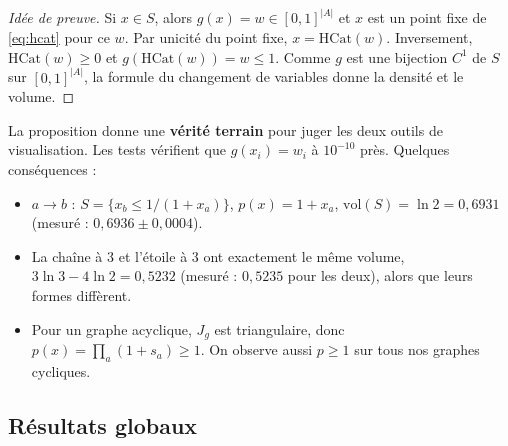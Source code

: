 \documentclass[10pt,a4paper]{article}
\theoremstyle{remark}
\newcommand{\HCat}{\mathrm{HCat}}
\begin{document}
\begin{proof}[Idée de preuve]
Si $x\in S$, alors $g(x)=w\in[0,1]^{|A|}$ et $x$ est un point fixe de \eqref{eq:hcat} pour
ce $w$. Par unicité du point fixe, $x=\HCat(w)$. Inversement, $\HCat(w)\ge0$ et
$g(\HCat(w))=w\le 1$. Comme $g$ est une bijection $C^1$ de $S$ sur $[0,1]^{|A|}$, la formule
du changement de variables donne la densité et le volume.
\end{proof}

La proposition donne une \textbf{vérité terrain} pour juger les deux outils de visualisation.
Les tests vérifient que $g(x_i)=w_i$ à $10^{-10}$ près. Quelques conséquences :
\begin{itemize}
\item $a\to b$ : $S=\{x_b\le 1/(1+x_a)\}$, $p(x)=1+x_a$, $\mathrm{vol}(S)=\ln2=0{,}6931$
(mesuré : $0{,}6936\pm0{,}0004$).
\item La chaîne à 3 et l'étoile à 3 ont exactement le même volume,
$3\ln3-4\ln2=0{,}5232$ (mesuré : $0{,}5235$ pour les deux), alors que leurs formes diffèrent.
\item Pour un graphe acyclique, $J_g$ est triangulaire, donc $p(x)=\prod_a(1+s_a)\ge1$.
On observe aussi $p\ge1$ sur tous nos graphes cycliques.
\end{itemize}

\subsection{Résultats globaux}
\end{document}
